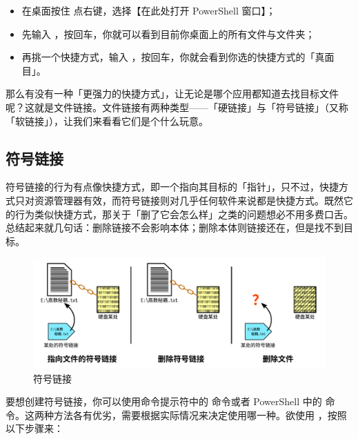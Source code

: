 {{{{\begin{itemize}
  \item 在桌面按住  点右键，选择【在此处打开 PowerShell 窗口】；
  \item 先输入 ，按回车，你就可以看到目前你桌面上的所有文件与文件夹；
  \item 再挑一个快捷方式，输入 ，按回车，你就会看到你选的快捷方式的「真面目」。
\end{itemize}

那么有没有一种「更强力的快捷方式」，让无论是哪个应用都知道去找目标文件呢？这就是文件链接。文件链接有两种类型——「硬链接」与「符号链接」（又称「软链接」），让我们来看看它们是个什么玩意。

\subsection{符号链接}

符号链接的行为有点像快捷方式，即一个指向其目标的「指针」，只不过，快捷方式只对资源管理器有效，而符号链接则对几乎任何软件来说都是快捷方式。既然它的行为类似快捷方式，那关于「删了它会怎么样」之类的问题想必不用多费口舌。总结起来就几句话：删除链接不会影响本体；删除本体则链接还在，但是找不到目标。

\begin{figure}[htb!]
  \centering
  \includegraphics[width=.8\textwidth]{assets/advanced/Symbolic_Link.pdf}
  \caption{符号链接}
  \label{fig:Symbolic_Link}
\end{figure}

要想创建符号链接，你可以使用命令提示符中的  命令或者 PowerShell 中的  命令。这两种方法各有优劣，需要根据实际情况来决定使用哪一种。欲使用 ，按照以下步骤来：


}}}}
